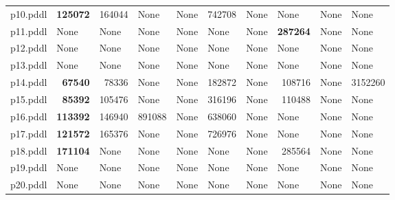 \documentclass{article}
\begin{document}
\begin{tabular}{@{}lrrrrrrrrr@{}}
p10.pddl & \textbf{125072} & 164044 & \multicolumn{1}{|l|}{None} & \multicolumn{1}{|l|}{None} & 742708 & \multicolumn{1}{|l|}{None} & \multicolumn{1}{|l|}{None} & \multicolumn{1}{|l|}{None} & \multicolumn{1}{|l|}{None} \\
p11.pddl & \multicolumn{1}{|l|}{None} & \multicolumn{1}{|l|}{None} & \multicolumn{1}{|l|}{None} & \multicolumn{1}{|l|}{None} & \multicolumn{1}{|l|}{None} & \multicolumn{1}{|l|}{None} & \textbf{287264} & \multicolumn{1}{|l|}{None} & \multicolumn{1}{|l|}{None} \\
p12.pddl & \multicolumn{1}{|l|}{None} & \multicolumn{1}{|l|}{None} & \multicolumn{1}{|l|}{None} & \multicolumn{1}{|l|}{None} & \multicolumn{1}{|l|}{None} & \multicolumn{1}{|l|}{None} & \multicolumn{1}{|l|}{None} & \multicolumn{1}{|l|}{None} & \multicolumn{1}{|l|}{None} \\
p13.pddl & \multicolumn{1}{|l|}{None} & \multicolumn{1}{|l|}{None} & \multicolumn{1}{|l|}{None} & \multicolumn{1}{|l|}{None} & \multicolumn{1}{|l|}{None} & \multicolumn{1}{|l|}{None} & \multicolumn{1}{|l|}{None} & \multicolumn{1}{|l|}{None} & \multicolumn{1}{|l|}{None} \\
p14.pddl & \textbf{67540} & 78336 & \multicolumn{1}{|l|}{None} & \multicolumn{1}{|l|}{None} & 182872 & \multicolumn{1}{|l|}{None} & 108716 & \multicolumn{1}{|l|}{None} & 3152260 \\
p15.pddl & \textbf{85392} & 105476 & \multicolumn{1}{|l|}{None} & \multicolumn{1}{|l|}{None} & 316196 & \multicolumn{1}{|l|}{None} & 110488 & \multicolumn{1}{|l|}{None} & \multicolumn{1}{|l|}{None} \\
p16.pddl & \textbf{113392} & 146940 & 891088 & \multicolumn{1}{|l|}{None} & 638060 & \multicolumn{1}{|l|}{None} & \multicolumn{1}{|l|}{None} & \multicolumn{1}{|l|}{None} & \multicolumn{1}{|l|}{None} \\
p17.pddl & \textbf{121572} & 165376 & \multicolumn{1}{|l|}{None} & \multicolumn{1}{|l|}{None} & 726976 & \multicolumn{1}{|l|}{None} & \multicolumn{1}{|l|}{None} & \multicolumn{1}{|l|}{None} & \multicolumn{1}{|l|}{None} \\
p18.pddl & \textbf{171104} & \multicolumn{1}{|l|}{None} & \multicolumn{1}{|l|}{None} & \multicolumn{1}{|l|}{None} & \multicolumn{1}{|l|}{None} & \multicolumn{1}{|l|}{None} & 285564 & \multicolumn{1}{|l|}{None} & \multicolumn{1}{|l|}{None} \\
p19.pddl & \multicolumn{1}{|l|}{None} & \multicolumn{1}{|l|}{None} & \multicolumn{1}{|l|}{None} & \multicolumn{1}{|l|}{None} & \multicolumn{1}{|l|}{None} & \multicolumn{1}{|l|}{None} & \multicolumn{1}{|l|}{None} & \multicolumn{1}{|l|}{None} & \multicolumn{1}{|l|}{None} \\
p20.pddl & \multicolumn{1}{|l|}{None} & \multicolumn{1}{|l|}{None} & \multicolumn{1}{|l|}{None} & \multicolumn{1}{|l|}{None} & \multicolumn{1}{|l|}{None} & \multicolumn{1}{|l|}{None} & \multicolumn{1}{|l|}{None} & \multicolumn{1}{|l|}{None} & \multicolumn{1}{|l|}{None} \\
\end{tabular}
\end{document}
